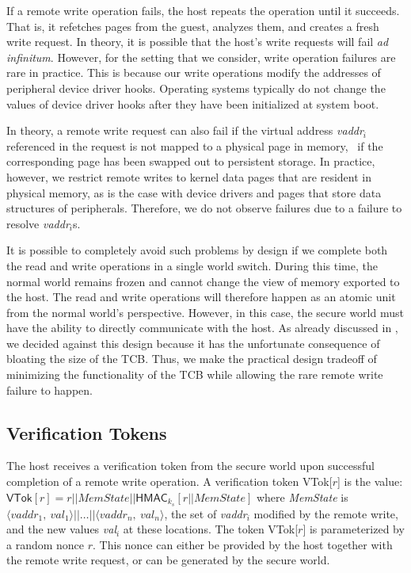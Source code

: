 If a remote write operation fails, the host repeats the operation until it
succeeds. That is, it refetches pages from the guest, analyzes them, and
creates a fresh write request. In theory, it is possible that the host's write
requests will fail \textit{ad infinitum}. However, for the setting that we
consider, write operation failures are rare in practice. This is because our
write operations modify the addresses of peripheral device driver hooks.
Operating systems typically do not change the values of device driver hooks
after they have been initialized at system boot. 

In theory, a remote write request can also fail if the virtual address
\textit{vaddr}$_i$ referenced in the request is not mapped to a physical page
in memory, \ie~if the corresponding page has been swapped out to persistent
storage. In practice, however, we restrict remote writes to kernel data pages
that are resident in physical memory, as is the case with device drivers and
pages that store data structures of peripherals. Therefore, we do not observe
failures due to a failure to resolve \textit{vaddr}$_i$s.

It is possible to completely avoid such problems by design if we complete both
the read and write operations in a single world switch. During this time, the
normal world remains frozen and cannot change the view of memory exported to
the host.  The read and write operations will therefore happen as an atomic
unit from the normal world's perspective. However, in this case, the secure
world must have the ability to directly communicate with the host. As already
discussed in , we decided against this
design because it has the unfortunate consequence of bloating the size of the
TCB.  Thus, we make the practical design tradeoff of minimizing the
functionality of the TCB while allowing the rare remote write failure to
happen.

\subsection{Verification Tokens}
\label{section:mechanism:tokens}

The host receives a verification token from the secure world upon successful
completion of a remote write operation. A verification token \textsf{VTok}[$r$]
is the value: 
%
%
$\textsf{VTok}[r] =
r||\textit{MemState}||\textsf{HMAC}_{k_s}[r||\textit{MemState}]$
%
%
where \textit{MemState} is
$\langle\textit{vaddr}_1,~\textit{val}_1\rangle||\ldots||\langle\textit{vaddr}_n,~\textit{val}_n\rangle$,
the set of \textit{vaddr}$_i$ modified by the remote write, and the new values
\textit{val}$_i$ at these locations. The token \textsf{VTok}[$r$] is
parameterized by a random nonce $r$. This nonce can either be provided by the
host together with the remote write request, or can be generated by the secure
world. 

